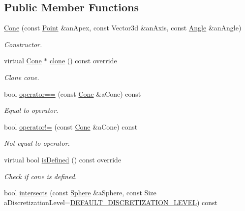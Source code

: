 \subsection*{Public Member Functions}
\begin{DoxyCompactItemize}
\item 
\hyperlink{classostk_1_1math_1_1geom_1_1d3_1_1objects_1_1_cone_ac86773a78cf513900e8b0d3a2709bfcb}{Cone} (const \hyperlink{classostk_1_1math_1_1geom_1_1d3_1_1objects_1_1_point}{Point} \&an\+Apex, const Vector3d \&an\+Axis, const \hyperlink{classostk_1_1math_1_1geom_1_1_angle}{Angle} \&an\+Angle)
\begin{DoxyCompactList}\small\item\em Constructor. \end{DoxyCompactList}\item 
virtual \hyperlink{classostk_1_1math_1_1geom_1_1d3_1_1objects_1_1_cone}{Cone} $\ast$ \hyperlink{classostk_1_1math_1_1geom_1_1d3_1_1objects_1_1_cone_a656d9720f23ab4e04bbb87dc85f9585a}{clone} () const override
\begin{DoxyCompactList}\small\item\em Clone cone. \end{DoxyCompactList}\item 
bool \hyperlink{classostk_1_1math_1_1geom_1_1d3_1_1objects_1_1_cone_a705e91fbd024f12e214030fd3a4ad8a0}{operator==} (const \hyperlink{classostk_1_1math_1_1geom_1_1d3_1_1objects_1_1_cone}{Cone} \&a\+Cone) const
\begin{DoxyCompactList}\small\item\em Equal to operator. \end{DoxyCompactList}\item 
bool \hyperlink{classostk_1_1math_1_1geom_1_1d3_1_1objects_1_1_cone_abdc26e7cac7c112933e7aab3acc1fc55}{operator!=} (const \hyperlink{classostk_1_1math_1_1geom_1_1d3_1_1objects_1_1_cone}{Cone} \&a\+Cone) const
\begin{DoxyCompactList}\small\item\em Not equal to operator. \end{DoxyCompactList}\item 
virtual bool \hyperlink{classostk_1_1math_1_1geom_1_1d3_1_1objects_1_1_cone_a16491ea1637cf69ad002f59bd2b83553}{is\+Defined} () const override
\begin{DoxyCompactList}\small\item\em Check if cone is defined. \end{DoxyCompactList}\item 
bool \hyperlink{classostk_1_1math_1_1geom_1_1d3_1_1objects_1_1_cone_a3a14e2f8f94a63eecfdce6dfabb26c14}{intersects} (const \hyperlink{classostk_1_1math_1_1geom_1_1d3_1_1objects_1_1_sphere}{Sphere} \&a\+Sphere, const Size a\+Discretization\+Level=\hyperlink{_pyramid_8hpp_a3eb9931e85ba4c9718113211e549e91d}{D\+E\+F\+A\+U\+L\+T\+\_\+\+D\+I\+S\+C\+R\+E\+T\+I\+Z\+A\+T\+I\+O\+N\+\_\+\+L\+E\+V\+EL}) const

\end{DoxyCompactItemize}
